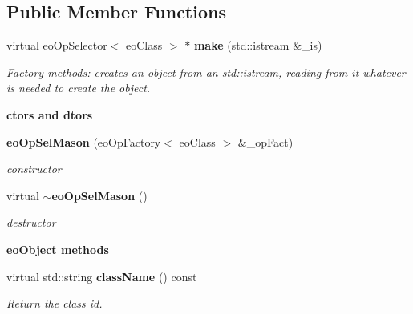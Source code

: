 \subsection*{Public Member Functions}
\begin{CompactItemize}
\item 
virtual eo\-Op\-Selector$<$ eo\-Class $>$ $\ast$ {\bf make} (std::istream \&\_\-is)
\begin{CompactList}\small\item\em Factory methods: creates an object from an std::istream, reading from it whatever is needed to create the object. \item\end{CompactList}\end{CompactItemize}
\begin{Indent}{\bf ctors and dtors}\par
\begin{CompactItemize}
\item 
{\bf eo\-Op\-Sel\-Mason} (eo\-Op\-Factory$<$ eo\-Class $>$ \&\_\-op\-Fact)\label{classeo_op_sel_mason_z15_0}

\begin{CompactList}\small\item\em constructor \item\end{CompactList}\item 
virtual {\bf $\sim$eo\-Op\-Sel\-Mason} ()\label{classeo_op_sel_mason_z15_1}

\begin{CompactList}\small\item\em destructor \item\end{CompactList}\end{CompactItemize}
\end{Indent}
\begin{Indent}{\bf eo\-Object methods}\par
\begin{CompactItemize}
\item 
virtual std::string {\bf class\-Name} () const \label{classeo_op_sel_mason_z17_0}

\begin{CompactList}\small\item\em Return the class id. \item\end{CompactList}\end{CompactItemize}
\end{Indent}
